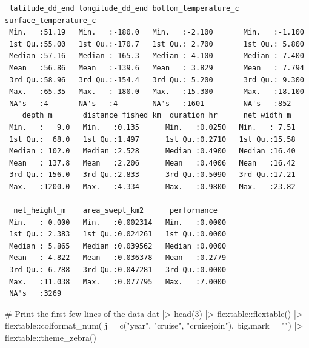 \documentclass[
  letterpaper,
  oneside,
  open=any]{scrbook}
\newenvironment{Shaded}{\begin{snugshade}}{\end{snugshade}}
\newcommand{\AttributeTok}[1]{\textcolor[rgb]{0.40,0.45,0.13}{#1}}
\newcommand{\CommentTok}[1]{\textcolor[rgb]{0.37,0.37,0.37}{#1}}
\newcommand{\DecValTok}[1]{\textcolor[rgb]{0.68,0.00,0.00}{#1}}
\newcommand{\FunctionTok}[1]{\textcolor[rgb]{0.28,0.35,0.67}{#1}}
\newcommand{\NormalTok}[1]{\textcolor[rgb]{0.00,0.23,0.31}{#1}}
\newcommand{\SpecialCharTok}[1]{\textcolor[rgb]{0.37,0.37,0.37}{#1}}
\newcommand{\StringTok}[1]{\textcolor[rgb]{0.13,0.47,0.30}{#1}}
\begin{document}
\begin{verbatim}
 latitude_dd_end longitude_dd_end bottom_temperature_c surface_temperature_c
 Min.   :51.19   Min.   :-180.0   Min.   :-2.100       Min.   :-1.100       
 1st Qu.:55.00   1st Qu.:-170.7   1st Qu.: 2.700       1st Qu.: 5.800       
 Median :57.16   Median :-165.3   Median : 4.100       Median : 7.400       
 Mean   :56.86   Mean   :-139.6   Mean   : 3.829       Mean   : 7.794       
 3rd Qu.:58.96   3rd Qu.:-154.4   3rd Qu.: 5.200       3rd Qu.: 9.300       
 Max.   :65.35   Max.   : 180.0   Max.   :15.300       Max.   :18.100       
 NA's   :4       NA's   :4        NA's   :1601         NA's   :852          
    depth_m       distance_fished_km  duration_hr      net_width_m   
 Min.   :   9.0   Min.   :0.135      Min.   :0.0250   Min.   : 7.51  
 1st Qu.:  68.0   1st Qu.:1.497      1st Qu.:0.2710   1st Qu.:15.58  
 Median : 102.0   Median :2.528      Median :0.4900   Median :16.40  
 Mean   : 137.8   Mean   :2.206      Mean   :0.4006   Mean   :16.42  
 3rd Qu.: 156.0   3rd Qu.:2.833      3rd Qu.:0.5090   3rd Qu.:17.21  
 Max.   :1200.0   Max.   :4.334      Max.   :0.9800   Max.   :23.82  
                                                                     
  net_height_m    area_swept_km2      performance    
 Min.   : 0.000   Min.   :0.002314   Min.   :0.0000  
 1st Qu.: 2.383   1st Qu.:0.024261   1st Qu.:0.0000  
 Median : 5.865   Median :0.039562   Median :0.0000  
 Mean   : 4.822   Mean   :0.036378   Mean   :0.2779  
 3rd Qu.: 6.788   3rd Qu.:0.047281   3rd Qu.:0.0000  
 Max.   :11.038   Max.   :0.077795   Max.   :7.0000  
 NA's   :3269                                        
\end{verbatim}

\begin{Shaded}
\begin{Highlighting}[]
\CommentTok{\# Print the first few lines of the data }
\NormalTok{dat }\SpecialCharTok{|\textgreater{}} 
  \FunctionTok{head}\NormalTok{(}\DecValTok{3}\NormalTok{) }\SpecialCharTok{|\textgreater{}} 
\NormalTok{  flextable}\SpecialCharTok{::}\FunctionTok{flextable}\NormalTok{() }\SpecialCharTok{|\textgreater{}}
\NormalTok{  flextable}\SpecialCharTok{::}\FunctionTok{colformat\_num}\NormalTok{(}
      \AttributeTok{j =} \FunctionTok{c}\NormalTok{(}\StringTok{"year"}\NormalTok{, }\StringTok{"cruise"}\NormalTok{, }\StringTok{"cruisejoin"}\NormalTok{), }
      \AttributeTok{big.mark =} \StringTok{""}\NormalTok{) }\SpecialCharTok{|\textgreater{}} 
\NormalTok{  flextable}\SpecialCharTok{::}\FunctionTok{theme\_zebra}\NormalTok{()}
\end{Highlighting}
\end{Shaded}
\end{document}
